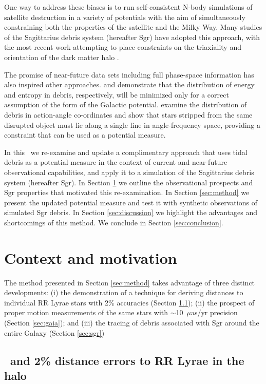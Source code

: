 One way to address these biases is to run self-consistent N-body simulations of
satellite destruction in a variety of potentials with the aim of simultaneously
constraining both the properties of the satellite and the Milky Way. Many
studies of the Sagittarius debris system (hereafter Sgr) have adopted this
approach, with the most recent work attempting to place constraints on the
triaxiality and orientation of the dark matter halo \citep{law10}.

The promise of near-future data sets including full phase-space information has
also inspired other approaches. \citet{binney08} and \citet{penarrubia12}
demonstrate that the distribution of energy and entropy in debris, respectively,
will be minimized only for a correct assumption of the form of the Galactic
potential. \citet{sanders13b} examine the distribution of debris in action-angle
co-ordinates and show that stars stripped from the same disrupted object must
lie along a single line in angle-frequency space, providing a constraint that
can be used as a potential measure.

In this \article\ we re-examine and update a complimentary approach that uses
tidal debris as a potential measure \citep[originally proposed
by][]{johnston99a} in the context of current and near-future observational
capabilities, and apply it to a simulation of the Sagittarius debris system
(hereafter Sgr). In Section \ref{sec:context} we outline the observational
prospects and Sgr properties that motivated this re-examination. In Section
\ref{sec:method} we present the updated potential measure and test it with
synthetic observations of simulated Sgr debris. In Section \ref{sec:discussion}
we highlight the advantages and shortcomings of this method. We conclude in
Section \ref{sec:conclusion}.

\section{Context and motivation} \label{sec:context}
The method presented in Section \ref{sec:method} takes advantage of three
distinct developments: (i) the demonstration of a technique for deriving
distances to individual RR Lyrae stars with 2\% accuracies (Section
\ref{sec:spitzer}); (ii) the prospect of proper motion measurements of the same
stars with $\sim$10~$\mu$as/yr precision (Section \ref{sec:gaia}); and (iii) the
tracing of debris associated with Sgr around the entire Galaxy (Section
\ref{sec:sgr})

\subsection{\spitzer\ and 2\% distance errors to RR Lyrae in the halo}
\label{sec:spitzer}

